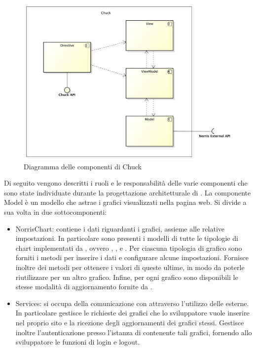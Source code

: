 		\begin{figure}[H]\centering
	        \includegraphics[width=\textwidth]{SpecificaTecnica/Pics/ComponentiChuck}
	        \caption{Diagramma delle componenti di Chuck}
	    \end{figure}
	    Di seguito vengono descritti i ruoli e le responsabilità delle varie componenti che sono state individuate durante la progettazione architetturale di .
			La componente Model è un modello che astrae i grafici visualizzati nella pagina web. Si divide a sua volta in due sottocomponenti:
			\begin{itemize}
				\item NorrisChart: contiene i dati riguardanti i grafici, assieme alle relative impostazioni. In particolare sono presenti i modelli di tutte le tipologie di chart implementati da , ovvero , ,  e . Per ciascuna tipologia di grafico sono forniti i metodi per inserire i dati e configurare alcune impostazioni. Fornisce inoltre dei metodi per ottenere i valori di queste ultime, in modo da poterle riutilizzare per un altro grafico. Infine, per ogni grafico sono disponibili le stesse modalità di aggiornamento fornite da .
				\item Services: si occupa della comunicazione con  attraverso l'utilizzo delle  esterne. In particolare gestisce le richieste dei grafici che lo sviluppatore  vuole inserire nel proprio sito e la ricezione degli aggiornamenti dei grafici stessi. Gestisce inoltre l'autenticazione presso l'istanza di  contenente tali grafici, fornendo allo sviluppatore le funzioni di login e logout.
			\end{itemize}

